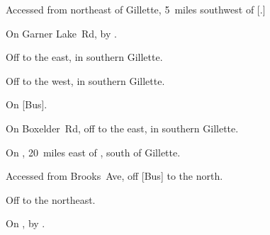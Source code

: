 
\begin{LocationList}

Accessed from  northeast of Gillette, 5~miles southwest of [.]

On Garner Lake~Rd, by  .

Off  to the east, in southern Gillette.

Off  to the west, in southern Gillette.

\Location{\GarageHQ \Garage}
On [Bus].

On Boxelder~Rd, off  to the east, in southern Gillette.

On , 20~miles east of , south of Gillette.

Accessed from Brooks~Ave, off [Bus]  to the north.

Off    to the northeast.

\Location{\TruckStop \Gas \Rest}
On , by  .

\end{LocationList}
